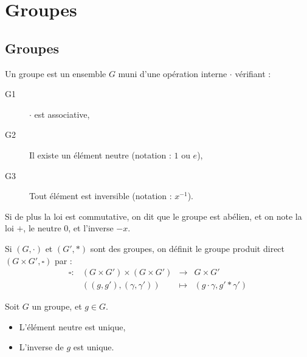 
\section{Groupes}
\vspace{0.5em}

\subsection{Groupes}
\vspace{0.5em}

\begin{defi}[Groupe]

Un groupe est un ensemble $G$ muni d'une opération interne $\cdotp$ vérifiant :
\begin{description}
 \item [G1] $\cdotp$ est associative,
 \item [G2] Il existe un élément neutre (notation : $1$ ou $e$),
 \item [G3] Tout élément est inversible (notation : $x^{-1}$).
\end{description}

Si de plus la loi est commutative, on dit que le groupe est abélien, et on note
la loi $+$, le neutre $0$, et l'inverse $-x$.
\end{defi}

\begin{defi}

Si $(G,\cdotp)$ et $(G',*)$ sont des groupes, on définit le groupe produit
direct $(G\times G', \square)$ par : 
\begin{displaymath}\begin{array}{rrcl}
 \square : & (G\times G')\times(G\times G') & \longrightarrow & G\times G' \\
& ((g,g') , (\gamma,\gamma')) &\longmapsto & (g\cdotp \gamma, g'*\gamma')
 \end{array}\end{displaymath}

\end{defi}

\begin{prop}

Soit $G$ un groupe, et $g\in G$.
 \begin{itemize}
  \item L'élément neutre est unique,
  \item L'inverse de $g$ est unique.
 \end{itemize}
\end{prop}

